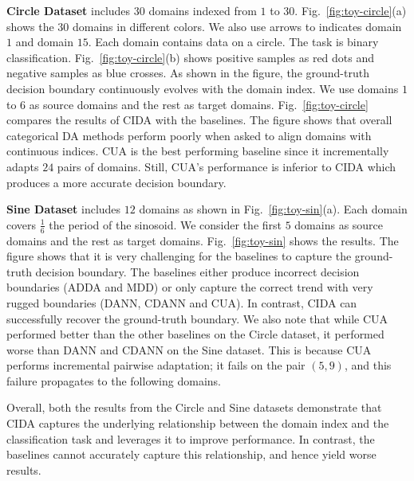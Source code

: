 \documentclass{article}
\newcommand{\figref}[1]{Fig.~\ref{#1}}
\begin{document}
\textbf{Circle Dataset} includes $30$ domains indexed from $1$ to $30$.
\figref{fig:toy-circle}(a) shows the $30$ domains in different colors. We also use arrows to indicates domain $1$ and domain $15$. Each domain contains data on a circle. The task is binary classification. \figref{fig:toy-circle}(b) shows positive samples as red dots and negative samples as blue crosses. As shown in the figure, the ground-truth decision boundary continuously evolves with the domain index. We use domains $1$ to $6$ as source domains and the rest as target domains.
\figref{fig:toy-circle} compares the results of CIDA  with the baselines. The figure shows that overall categorical DA methods perform poorly when asked to align domains with continuous indices. CUA is the best performing baseline since it incrementally adapts $24$ pairs of domains. Still, CUA's performance is inferior to CIDA which produces a more accurate decision boundary.





\textbf{Sine Dataset} includes $12$ domains as shown in \figref{fig:toy-sin}(a). Each domain covers $\frac{1}{6}$ the period of the sinosoid. We consider the first $5$ domains as source domains and the rest as target domains.
\figref{fig:toy-sin} shows the results. The figure shows that it is very challenging for the baselines to capture the ground-truth decision boundary. The baselines either produce incorrect decision boundaries (ADDA and MDD) or only capture the correct trend with very rugged boundaries (DANN, CDANN and CUA). In contrast, CIDA can successfully recover the ground-truth boundary.
We also note that while CUA  performed better than the other baselines on the Circle dataset, it performed worse than DANN and CDANN on the Sine dataset. This is because CUA performs incremental pairwise adaptation; it fails on the pair $(5,9)$, and this failure propagates to the following domains.

Overall, both the results from the Circle and Sine datasets demonstrate that CIDA captures the underlying relationship between the domain index and the classification task and leverages it to improve performance. In contrast, the baselines cannot accurately capture this relationship, and hence yield worse results.




\newcommand{\tabincell}[2]{\begin{tabular}{@{}#1@{}}#2\end{tabular}}
\end{document}
